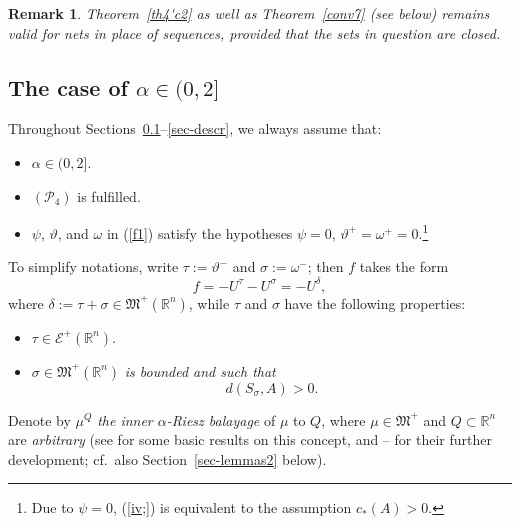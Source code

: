 \documentclass[12pt,a4paper,reqno]{amsart} %
\theoremstyle{lause}
\theoremstyle{maaritelma}
\theoremstyle{lause}
\theoremstyle{maaritelma}
\newtheorem{remark}[theorem]{Remark}
\numberwithin{equation}{section}
\begin{document}
\begin{remark}
Theorem~\ref{th4'c2} as well as Theorem~\ref{conv7} (see below) remains valid for {\it nets} in place of sequences, provided that the sets in question are {\it closed}.
\end{remark}

\subsection{The case of $\alpha\in(0,2]$}\label{subs-main2}Throughout Sections~\ref{subs-main2}--\ref{sec-descr}, we always assume that:
\begin{itemize}
\item $\alpha\in(0,2]$.
\item $(\mathcal P_4)$ is fulfilled.
\item $\psi$, $\vartheta$, and $\omega$ in (\ref{f1}) satisfy the hypotheses
$\psi=0$, $\vartheta^+=\omega^+=0$.\footnote{Due to $\psi=0$, (\ref{iv;}) is equivalent to the assumption $c_*(A)>0$.}
\end{itemize}

To simplify notations, write $\tau:=\vartheta^-$ and $\sigma:=\omega^-$; then $f$ takes the form
\begin{equation}\label{f3'}
f=-U^\tau-U^\sigma=-U^\delta,
\end{equation}
where $\delta:=\tau+\sigma\in\mathfrak M^+(\mathbb R^n)$, while $\tau$ and $\sigma$ have the following properties:
\begin{itemize}
\item[$(\mathcal P_2')$] $\tau\in\mathcal E^+(\mathbb R^n)$.
\item[$(\mathcal P_3')$] $\sigma\in\mathfrak M^+(\mathbb R^n)$ {\it is bounded and such that}
\begin{equation}\label{f3''}d(S_\sigma,A)>0.\end{equation}
\end{itemize}

Denote by $\mu^Q$ {\it the inner $\alpha$-Riesz balayage} of $\mu$ to $Q$, where $\mu\in\mathfrak M^+$ and $Q\subset\mathbb R^n$ are {\it arbitrary} (see \cite{Z-bal,Z-bal2} for some basic results on this concept, and \cite{Z-arx1}--\cite{Z-arx} for their further development; cf.\ also Section~\ref{sec-lemmas2} below).
\end{document}

